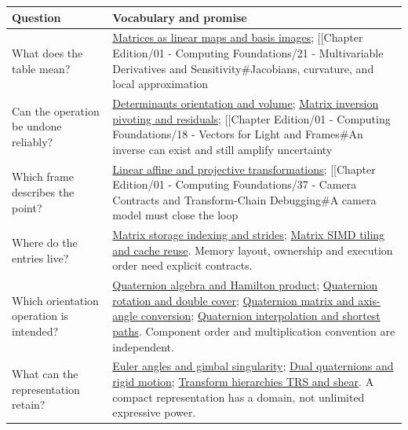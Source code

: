 {\def\LTcaptype{none} %
\begin{longtable}[]{@{}
  >{\raggedright\arraybackslash}p{}
  >{\raggedright\arraybackslash}p{}@{}}
\toprule\noalign{}
\begin{minipage}[b]{\linewidth}\raggedright
Question
\end{minipage} & \begin{minipage}[b]{\linewidth}\raggedright
Vocabulary and promise
\end{minipage} \\
\midrule\noalign{}
\endhead
\bottomrule\noalign{}
\endlastfoot
What does the table mean? & \hyperref[appendix-bd39c3bf5d64]{Matrices as linear maps and basis images}; {[}{[}Chapter Edition/01 - Computing Foundations/21 - Multivariable Derivatives and Sensitivity\#Jacobians, curvature, and local approximation \\
Can the operation be undone reliably? & \hyperref[appendix-da478be01d02]{Determinants orientation and volume}; \hyperref[appendix-48d2e66378ab]{Matrix inversion pivoting and residuals}; {[}{[}Chapter Edition/01 - Computing Foundations/18 - Vectors for Light and Frames\#An inverse can exist and still amplify uncertainty \\
Which frame describes the point? & \hyperref[appendix-0bf0ca73f735]{Linear affine and projective transformations}; {[}{[}Chapter Edition/01 - Computing Foundations/37 - Camera Contracts and Transform-Chain Debugging\#A camera model must close the loop \\
Where do the entries live? & \hyperref[appendix-ffdc1d4e5350]{Matrix storage indexing and strides}; \hyperref[appendix-1bfb7c657105]{Matrix SIMD tiling and cache reuse}. Memory layout, ownership and execution order need explicit contracts. \\
Which orientation operation is intended? & \hyperref[appendix-965d9260eeab]{Quaternion algebra and Hamilton product}; \hyperref[appendix-8e61ab68f6b2]{Quaternion rotation and double cover}; \hyperref[appendix-26d8da71f6c4]{Quaternion matrix and axis-angle conversion}; \hyperref[appendix-9b4b8254f26b]{Quaternion interpolation and shortest paths}. Component order and multiplication convention are independent. \\
What can the representation retain? & \hyperref[appendix-5f723fbd0593]{Euler angles and gimbal singularity}; \hyperref[appendix-d1ea57347893]{Dual quaternions and rigid motion}; \hyperref[appendix-292c061cd47c]{Transform hierarchies TRS and shear}. A compact representation has a domain, not unlimited expressive power. \\
\end{longtable}
}

